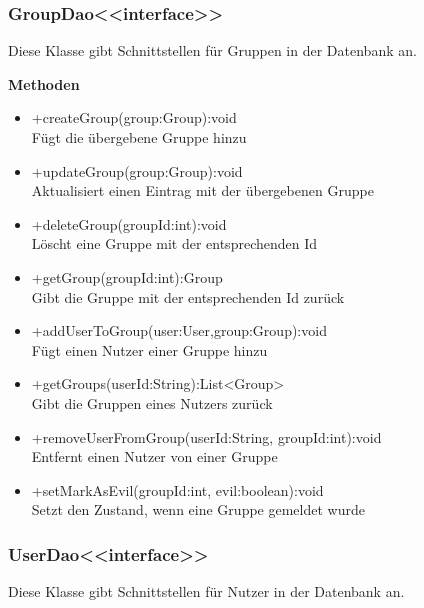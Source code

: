 \subsubsection{GroupDao<<interface>>}
Diese Klasse gibt Schnittstellen für Gruppen in der Datenbank an.

\textbf{Methoden}
\begin{itemize}
	\item +createGroup(group:Group):void \\Fügt die übergebene Gruppe hinzu
	\item +updateGroup(group:Group):void \\Aktualisiert  einen Eintrag mit der übergebenen Gruppe
	\item +deleteGroup(groupId:int):void \\Löscht eine Gruppe mit der entsprechenden Id
	\item +getGroup(groupId:int):Group \\Gibt die Gruppe mit der entsprechenden Id zurück
	\item +addUserToGroup(user:User,group:Group):void \\Fügt einen Nutzer einer Gruppe hinzu
	\item +getGroups(userId:String):List<Group> \\Gibt die Gruppen eines Nutzers zurück
	\item +removeUserFromGroup(userId:String, groupId:int):void \\Entfernt einen Nutzer von einer Gruppe
	\item +setMarkAsEvil(groupId:int, evil:boolean):void \\Setzt den Zustand, wenn eine Gruppe gemeldet wurde
\end{itemize}

\subsubsection{UserDao<<interface>>}
Diese Klasse gibt Schnittstellen für Nutzer in der Datenbank an.

